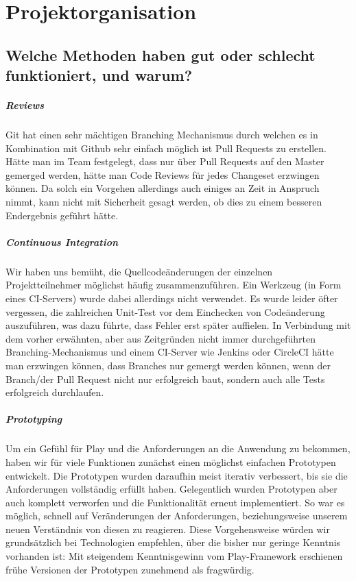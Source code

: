 \documentclass[12pt,DIV14,BCOR10mm,a4paper,parskip=half-,headsepline,headinclude,english,ngerman,bibliography=totocnumbered]{scrreprt}
\begin{document}
\vspace*{-3cm}

\tableofcontents  %

\chapter{Projektorganisation}


\section{Welche Methoden haben gut oder schlecht funktioniert, und warum?}

\paragraph{Reviews}
Git hat einen sehr mächtigen Branching Mechanismus durch welchen es in Kombination mit Github sehr einfach möglich ist Pull Requests zu erstellen. Hätte man im Team festgelegt, dass nur über Pull Requests auf den Master gemerged werden, hätte man Code Reviews für jedes Changeset erzwingen können. Da solch ein Vorgehen allerdings auch einiges an Zeit in Anspruch nimmt, kann nicht mit Sicherheit gesagt werden, ob dies zu einem besseren Endergebnis geführt hätte.

\paragraph{Continuous Integration}
Wir haben uns bemüht, die Quellcodeänderungen der einzelnen Projektteilnehmer möglichst häufig zusammenzuführen. Ein Werkzeug (in Form eines CI-Servers) wurde dabei allerdings nicht verwendet. Es wurde leider öfter vergessen, die zahlreichen Unit-Test vor dem Einchecken von Codeänderung auszuführen, was dazu führte, dass Fehler erst später auffielen.
In Verbindung mit dem vorher erwähnten, aber aus Zeitgründen nicht immer durchgeführten Branching-Mechanismus und einem CI-Server wie Jenkins oder CircleCI hätte man erzwingen können, dass Branches nur gemergt werden können, wenn der Branch/der Pull Request nicht nur erfolgreich baut, sondern auch alle Tests erfolgreich durchlaufen.

\paragraph{Prototyping}
Um ein Gefühl für Play und die Anforderungen an die Anwendung zu bekommen, haben wir für viele Funktionen zunächst einen möglichst einfachen Prototypen entwickelt. Die Prototypen wurden daraufhin meist iterativ verbessert, bis sie die Anforderungen vollständig erfüllt haben. Gelegentlich wurden Prototypen aber auch komplett verworfen und die Funktionalität erneut implementiert. So war es möglich, schnell auf Veränderungen der Anforderungen, beziehungsweise unserem neuen Verständnis von diesen zu reagieren. Diese Vorgehensweise würden wir grundsätzlich bei Technologien empfehlen, über die bisher nur geringe Kenntnis vorhanden ist: Mit steigendem Kenntnisgewinn vom Play-Framework erschienen frühe Versionen der Prototypen zunehmend als fragwürdig.
\end{document}
